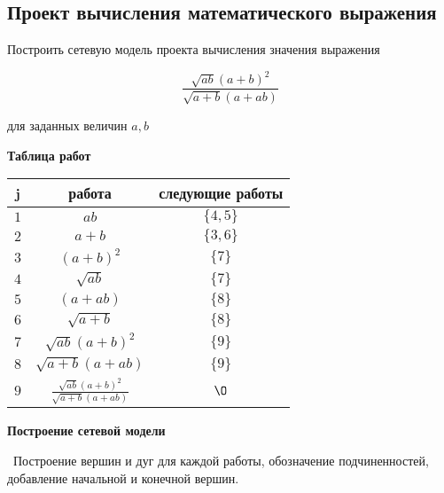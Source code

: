 \subsection{Проект вычисления математического выражения}\label{proj:math_expr_calc_project}


Построить сетевую модель проекта вычисления значения выражения

\[\boxed{\frac{\sqrt{ab}(a + b)^2}{\sqrt{a + b}(a + ab)}}\]

для заданных величин $a, b$

\bigskip

\textbf{Таблица работ}

\begin{table}[H]
	\centering
	\begin{tabular}{ | c | c | c | } 
		\hline
		j & работа & следующие работы \\\hline
		$1$ & $ab$ & $\{4,5\}$ \\\hline
		$2$ & $a+b$ & $\{3, 6\}$ \\\hline
		$3$ & $(a+b)^2$ & $\{7\}$ \\\hline
		$4$ & $\sqrt{ab}$ & $\{7\}$ \\\hline
		$5$ & $(a+ab)$ & $\{8\}$ \\\hline
		$6$ & $\sqrt{a+b}$ & $\{8\}$ \\\hline
		$7$ & $\sqrt{ab}(a+b)^2$ & $\{9\}$ \\\hline
		$8$ & $\sqrt{a+b}(a+ab)$ & $\{9\}$ \\\hline
		$9$ & $\frac{\sqrt{ab}(a + b)^2}{\sqrt{a + b}(a + ab)}$ & $\O$ \\\hline
	\end{tabular}
\end{table}

\bigskip

\textbf{Построение сетевой модели}

 $\,$ Построение вершин и дуг для каждой работы, обозначение подчиненностей, добавление начальной и конечной вершин.

